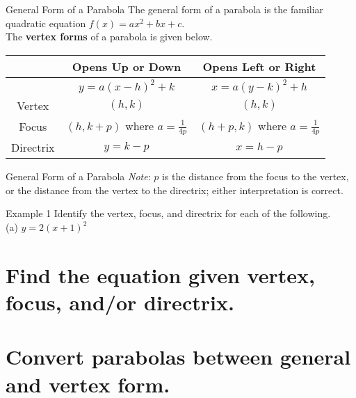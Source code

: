 \documentclass[t]{beamer}
\begin{document}
\begin{frame}{General Form of a Parabola}
The general form of a parabola is the familiar quadratic equation $f(x) = ax^2 + bx + c$.	\newline\\	\pause
The {\color{blue}\textbf{vertex forms}} of a parabola is given below.

\begin{center}
    \setlength{\extrarowheight}{5pt}
    \begin{tabular}{c|c|c}
    &   \textbf{Opens Up or Down}   &   \textbf{Opens Left or Right}    \\  \hline
    &   $y = a(x-h)^2 + k$  &   $x = a(y-k)^2 + h$  \\[5pt]  \hline
    Vertex  &   $(h,k)$ &   $(h,k)$ \\[5pt]  \hline
    Focus   &   $(h,k+p)$ where $a = \frac{1}{4p}$   &   $(h+p,k)$ where $a = \frac{1}{4p}$  \\[5pt] \hline
    Directrix   &   $y = k-p$   &   $x = h-p$   \\
    \end{tabular}
\end{center}
\end{frame}

\begin{frame}{General Form of a Parabola}
\emph{Note}: $p$ is the distance from the focus to the vertex, or the distance from the vertex to the directrix; either interpretation is correct.
\end{frame}

\begin{frame}{Example 1}
Identify the vertex, focus, and directrix for each of the following.    \newline\\  
(a) \quad $ y = 2(x+1)^2 $
\end{frame}


\section{Find the equation given vertex, focus, and/or directrix.}
\section{Convert parabolas between general and vertex form.}
\end{document}
